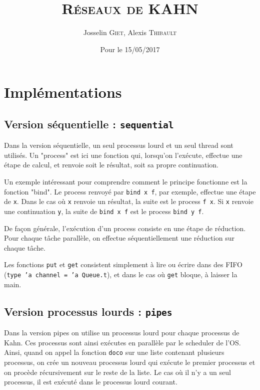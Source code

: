 \documentclass[11pt,a4paper]{article}
\title{\textsc{Réseaux de KAHN}}   %
\author{Josselin \textsc{Giet}, Alexis \textsc{Thibault}}  %
\date{Pour le 15/05/2017}    %
\renewcommand{\tt}[1]{\texttt{#1}}
\begin{document}
\maketitle

\tableofcontents





\section{Implémentations}


\subsection{Version séquentielle : \texttt{sequential}}

Dans la version séquentielle, un seul processus lourd et un seul thread sont
utilisés. Un "process" est ici une fonction qui, lorsqu'on l'exécute, effectue une
étape de calcul, et renvoie soit le résultat, soit sa propre continuation.

Un exemple intéressant pour comprendre comment le principe fonctionne est la
fonction "bind". Le process renvoyé par \texttt{bind x f}, par exemple, effectue une
étape de \tt{x}. Dans le cas où \tt{x} renvoie un résultat, la suite est le process
\tt{f x}. Si \tt{x} renvoie une continuation \tt{y}, la suite de \tt{bind x f} est le process
\tt{bind y f}.

De façon générale, l'exécution d'un process consiste en une étape de
réduction. Pour chaque tâche parallèle, on effectue séquentiellement une
réduction sur chaque tâche.

Les fonctions \tt{put} et \tt{get} consistent simplement à lire ou écrire dans des
FIFO (\tt{type 'a channel = 'a Queue.t}), et dans le cas où \tt{get} bloque,
 à laisser la main.


\subsection{Version processus lourds : \texttt{pipes}}

Dans la version pipes on utilise un processus lourd pour chaque processus
de Kahn. Ces processus sont ainsi exécutes en parallèle par le scheduler
de l'OS. Ainsi, quand on appel la fonction \tt{doco} sur une liste contenant
plusieurs processus, on crée un nouveau processus lourd qui exécute le
premier processus et on procède récursivement sur le reste de la liste.
Le cas où il n'y a un seul processus, il est exécuté dans le processus
lourd courant.
\end{document}
